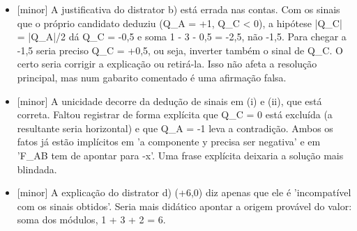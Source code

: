 \documentclass{article}%
\begin{document}
\begin{itemize}%
\item%
{[}minor{]} A justificativa do distrator b) está errada nas contas. Com os sinais que o próprio candidato deduziu (Q\_A = +1, Q\_C < 0), a hipótese |Q\_C| = |Q\_A|/2 dá Q\_C = -0,5 e soma 1 - 3 - 0,5 = -2,5, não -1,5. Para chegar a -1,5 seria preciso Q\_C = +0,5, ou seja, inverter também o sinal de Q\_C. O certo seria corrigir a explicação ou retirá{-}la. Isso não afeta a resolução principal, mas num gabarito comentado é uma afirmação falsa.%
\item%
{[}minor{]} A unicidade decorre da dedução de sinais em (i) e (ii), que está correta. Faltou registrar de forma explícita que Q\_C = 0 está excluída (a resultante seria horizontal) e que Q\_A = -1 leva a contradição. Ambos os fatos já estão implícitos em 'a componente y precisa ser negativa' e em 'F\_AB tem de apontar para -x'. Uma frase explícita deixaria a solução mais blindada.%
\item%
{[}minor{]} A explicação do distrator d) (+6,0) diz apenas que ele é 'incompatível com os sinais obtidos'. Seria mais didático apontar a origem provável do valor: soma dos módulos, 1 + 3 + 2 = 6.%
\end{itemize}%
\end{document}
